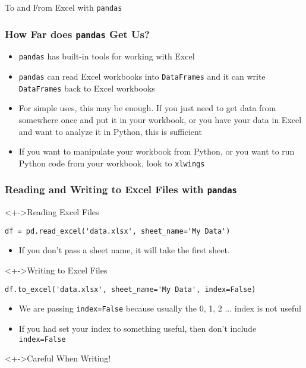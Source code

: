 \documentclass[handout, 11pt]{beamer}
\begin{document}
\begin{section}{To and From Excel with \texttt{pandas}}
\begin{frame}
\frametitle{How Far does \texttt{pandas} Get Us?}
\begin{itemize}
\item \texttt{pandas}
has built-in tools for working with Excel
\vfill
\item \texttt{pandas}
can read Excel workbooks into
\texttt{DataFrames}
and it can write
\texttt{DataFrames}
back to Excel workbooks
\vfill
\item For simple uses, this may be enough. If you just need to get data from somewhere once and put it in your workbook, or you have your data in Excel and want to analyze it in Python, this is sufficient
\vfill
\item If you want to manipulate your workbook from Python, or you want to run Python code from your workbook, look to
\texttt{xlwings}
\end{itemize}
\end{frame}
\begin{frame}[fragile]
\frametitle{Reading and Writing to Excel Files with \texttt{pandas}}
\begin{block}<+->{Reading Excel Files}
\begin{verbatim}
df = pd.read_excel('data.xlsx', sheet_name='My Data')
\end{verbatim}
\vspace{-0.3cm}
\begin{itemize}
\item If you don't pass a sheet name, it will take the first sheet.
\end{itemize}
\end{block}
\vfill
\begin{block}<+->{Writing to Excel Files}
\begin{verbatim}
df.to_excel('data.xlsx', sheet_name='My Data', index=False)
\end{verbatim}
\vspace{-0.3cm}
\begin{itemize}
\item We are passing
\texttt{index=False}
because usually the 0, 1, 2 ... index is not useful
\item If you had set your index to something useful, then don't include
\texttt{index=False}
\end{itemize}
\end{block}
\vfill
\begin{alertblock}<+->{Careful When Writing!}

\end{alertblock}
\end{frame}
\end{section}
\end{document}

